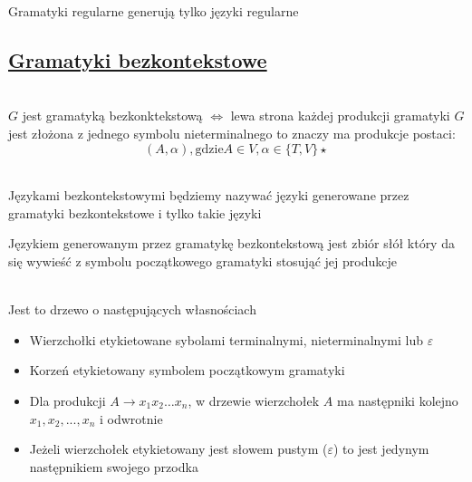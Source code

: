 	\begin{tw}
		Gramatyki regularne generują tylko języki regularne
	\end{tw}
		
\subsection{\href{http://pl.wikipedia.org/wiki/Gramatyka_bezkontekstowa}{Gramatyki bezkontekstowe}}
	
	\begin{df}~\\
		$G$ jest gramatyką bezkonktekstową $\Leftrightarrow$ lewa strona każdej produkcji gramatyki $G$ jest złożona z jednego symbolu
		nieterminalnego to znaczy ma produkcje postaci:
			$$
				(A, \alpha), \text{gdzie} A\in V, \alpha \in \{T,V\}\star
			$$
	\end{df}
	
	\begin{df}~\\
		Językami bezkontekstowymi będziemy nazywać języki generowane przez gramatyki bezkontekstowe i tylko takie języki		
		
		\begin{uwaga}
			Językiem generowanym przez gramatykę bezkontekstową jest zbiór słół który da się wywieść z symbolu początkowego gramatyki stosująć
			jej produkcje
		\end{uwaga}
	\end{df}
	
	\begin{df}~\\
		Jest to drzewo o następujących własnościach
		\begin{itemize}
			\item Wierzchołki etykietowane sybolami terminalnymi, nieterminalnymi lub $\varepsilon$
			\item Korzeń etykietowany symbolem początkowym gramatyki
			\item Dla produkcji $A\rightarrow x_1x_2 \dots x_n$, w drzewie wierzchołek $A$ ma następniki 
			kolejno $x_1, x_2, ..., x_n$ i odwrotnie
			\item Jeżeli wierzchołek etykietowany jest słowem pustym ($\varepsilon$) to jest jedynym
			następnikiem swojego przodka
		\end{itemize}
	\end{df}

